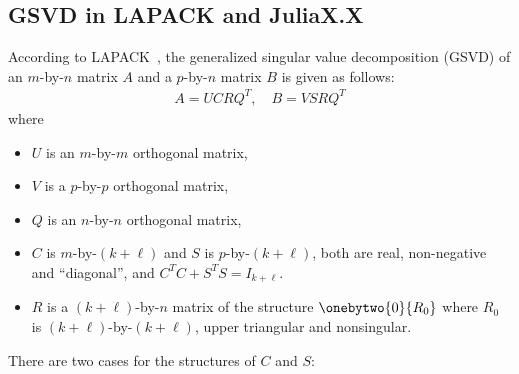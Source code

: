 \subsection{GSVD in LAPACK and JuliaX.X} \label{def}
According to LAPACK~\cite[pp.~23--24]{anderson1999lapack},
the generalized singular value decomposition (GSVD) 
of an $m$-by-$n$ matrix $A$ and a $p$-by-$n$ matrix $B$ is given as follows:
\begin{align} \label{eq:gsvdbylapack}
A = UCRQ^T, \quad B = VSRQ^T
\end{align}
where 
\begin{itemize}
\item $U$ is an $m$-by-$m$ orthogonal matrix,

\item $V$ is a $p$-by-$p$ orthogonal matrix,

\item $Q$ is an $n$-by-$n$ orthogonal matrix,

\item $C$ is $m$-by-$(k+\ell)$ and $S$ is $p$-by-$(k+\ell)$, both are real, non-negative and ``diagonal'', and $C^T C + S^T S = I_{k+\ell}$.
%


\item $R$ is a $(k+\ell)$-by-$n$ matrix of the structure 
$\onebytwo{0}{R_0}$
where $R_0$ is $(k+\ell)$-by-$(k+\ell)$, upper triangular and nonsingular. 
\end{itemize}
There are two cases for the structures of $C$ and $S$:
